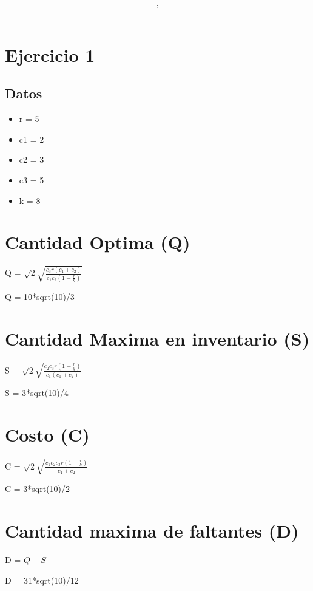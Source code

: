 \documentclass{article}
\author{\nombre , \carnet}
\title{\textbf{\Huge\titulo}}
\newcommand*\rbreak{\par\noindent\linebreak}
\begin{document}
%

\maketitle


\section{Ejercicio 1}
\subsection{Datos}
\begin{itemize}
\item r = 5
\item c1 = 2
\item c2 = 3
\item c3 = 5
\item k = 8
\end{itemize}
\section{\Huge Cantidad Optima (Q)}
\begin{Huge}
Q = $\sqrt{2} \sqrt{\frac{c_{3} r \left(c_{1} + c_{2}\right)}{c_{1} c_{2} \left(1 - \frac{r}{k}\right)}}$\rbreak\rbreak
Q = 10*sqrt(10)/3
\end{Huge}
\section{\Huge Cantidad Maxima en inventario (S)}
\begin{Huge}
S = $\sqrt{2} \sqrt{\frac{c_{2} c_{3} r \left(1 - \frac{r}{k}\right)}{c_{1} \left(c_{1} + c_{2}\right)}}$\rbreak\rbreak
S = 3*sqrt(10)/4
\end{Huge}
\section{\Huge Costo (C)}
\begin{Huge}
C = $\sqrt{2} \sqrt{\frac{c_{1} c_{2} c_{3} r \left(1 - \frac{r}{k}\right)}{c_{1} + c_{2}}}$\rbreak\rbreak
C = 3*sqrt(10)/2
\end{Huge}
\section{\Huge Cantidad maxima de faltantes (D)}
\begin{Huge}
D = $Q - S$\rbreak\rbreak
D = 31*sqrt(10)/12
\end{Huge}
\end{document}
